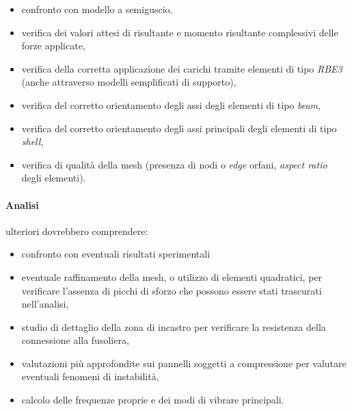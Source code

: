 \documentclass[
10pt, %
a4paper, %
oneside, %
headinclude,footinclude, %
BCOR5mm, %
]{scrartcl}
\begin{document}
\begin{itemize}
	\item confronto con modello a semiguscio,
	\item verifica dei valori attesi di risultante e momento risultante complessivi delle forze applicate,
	\item verifica della corretta applicazione dei carichi tramite elementi di tipo \emph{RBE3} (anche attraverso modelli semplificati di supporto),
	\item verifica del corretto orientamento degli assi degli elementi di tipo \emph{beam},
	\item verifica del corretto orientamento degli assi principali degli elementi di tipo \emph{shell},
	\item verifica di qualità della mesh (presenza di nodi o \emph{edge} orfani, \emph{aspect ratio} degli elementi).
\end{itemize}

\paragraph{Analisi} ulteriori dovrebbero comprendere:

\begin{itemize}
	\item confronto con eventuali risultati sperimentali
	\item eventuale raffinamento della mesh, o utilizzo di elementi quadratici, per verificare l'assenza di picchi di sforzo che possono essere stati trascurati nell'analisi,
	\item studio di dettaglio della zona di incastro per verificare la resistenza della connessione alla fusoliera,
	\item valutazioni più approfondite sui pannelli soggetti a compressione per valutare eventuali fenomeni di instabilità,
	\item calcolo delle frequenze proprie e dei modi di vibrare principali.
\end{itemize}








%


\end{document}
